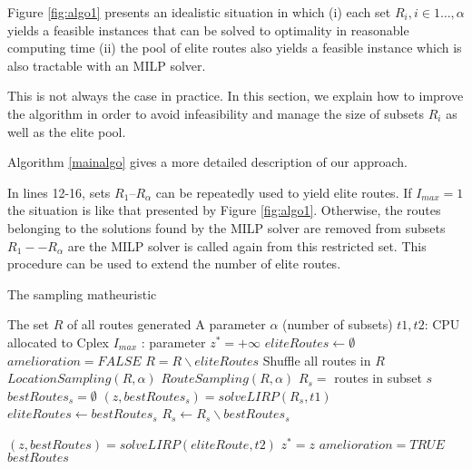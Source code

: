\documentclass[a4paper,10pt]{article}
\begin{document}
\begin{linenumbers}
Figure \ref{fig:algo1} presents an idealistic situation in which 
(i) each set $R_i, i \in 1\dots, \alpha$ yields a feasible instances that can be solved to optimality in reasonable computing time
(ii) the pool of elite routes also yields a feasible instance which is also tractable with an MILP solver. 

This is not always the case in practice. In this section, we explain how to improve the algorithm in order to avoid infeasibility and manage the size of subsets $R_i$ as well as the elite pool. 


Algorithm \ref{mainalgo} gives a more detailed description of our approach. 


In lines 12-16, sets $R_1$--$R_\alpha$ can be repeatedly used to yield elite routes. If $I_{max}=1$ the situation is like that presented by Figure \ref{fig:algo1}. Otherwise, the routes belonging to the solutions found by the MILP solver are removed from subsets $R_1 -- R_\alpha $ are the MILP solver is called again from this restricted set. This procedure can be used to extend the number of elite routes. 




\begin{algorithm}
	\caption{The sampling matheuristic}
	\label{mainalgo}
	\begin{algorithmic}[1]
		\REQUIRE  The set $R$ of all routes generated
		\REQUIRE A parameter $\alpha$ (number of subsets)
		\REQUIRE $t1, t2$: CPU allocated to Cplex
		\REQUIRE $I_{max}$ : parameter
		\STATE $z^*= +\infty$
		\STATE $eliteRoutes \leftarrow \emptyset$
		\REPEAT
			\STATE $amelioration = FALSE$
			\STATE $R =  R \backslash eliteRoutes$
			\STATE Shuffle all routes in $R$
			\STATE $LocationSampling(R,\alpha)$ 
			\STATE $RouteSampling(R,\alpha)$	
				\STATE $R_s = $ routes in subset $s$
				\STATE $bestRoutes_s = \emptyset$
					\STATE $(z,bestRoutes_s) = solveLIRP(R_s,t1)$ 
					\STATE $eliteRoutes \leftarrow bestRoutes_s$
					\STATE $R_s \leftarrow R_s \backslash bestRoutes_s$
					
				\ENDFOR
			\ENDFOR
			\STATE 	$(z,bestRoutes) = solveLIRP(eliteRoute, t2)$
				\STATE $z^*=z$
				\STATE $amelioration =TRUE$
			\ENDIF
		\RETURN $bestRoutes$
	\end{algorithmic}
\end{algorithm}







\end{linenumbers}
\end{document}
